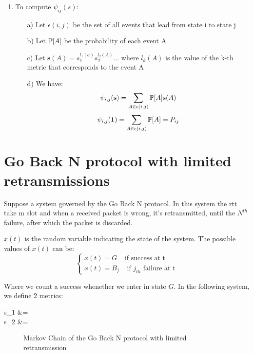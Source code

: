 \begin{enumerate}
\begin{esp}
		\end{esp}
	\item To compute $\psi_{ij}(s)$:
		\begin{itemize}
			\item[a)] Let $\epsilon(i,j)$ be the set of all events that lead from state i to state j
			\item[b)] Let $\mathbb{P}[A]$ be the probability of each event A
			\item[c)] Let $\textbf{s}(A) = s_1^{l_1(a)}s_2^{l_2(A)}...$ where $l_k(A)$ is the value of the k-th metric that corresponds to the event A
			\item[d)] We have: $$\psi_{i,j}(\textbf{s}) = \sum_{A \in \epsilon(i,j)} \mathbb{P}[A]\textbf{s}(A)$$
			$$\psi_{i,j}(\mathbf{1}) =\sum_{A \in \epsilon(i,j)} \mathbb{P}[A] = P_{ij}$$
		\end{itemize}
\end{enumerate}


\chapter{Go Back N protocol with limited retransmissions}
Suppose a system governed by the Go Back N protocol.
In this system the \gls{rtt} take m slot and when a received packet is wrong, it's retransmitted, until the $N^{th}$ failure, after which the packet is discarded.

$x(t)$ is the random variable indicating the state of the system. The possible values of $x(t)$ can be:
\begin{equation*}\begin{cases}
	 x(t) = G &\text{if success at t} \\
	 x(t) = B_j &\text{ if $j_{th}$ failure at t}
\end{cases}\end{equation*}

Where we count a success whenether we enter in state $G$.
In the following system, we define 2 metrics:
\begin{esp*}
	s_1 &= \\
	s_2 &= 
\end{esp*}

\begin{figure}[h]
	\begin{center}
		
	\end{center}
	\caption{Markov Chain of the Go Back N protocol with limited retransmission}
	\label{fig:gbn_mc_complete}
\end{figure}

